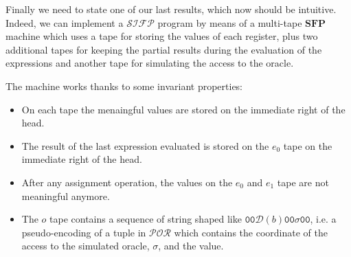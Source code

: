 \documentclass[10pt]{amsart}
\newcommand{\SFP}{\mathbf{SFP}}
\newcommand{\POR}{\mathcal{POR}}
\newcommand{\SIFP}{\mathcal{SIFP}}
\newcommand{\zero}{\mathtt{0}}
\newcommand{\NN}{\mathbb{N}}
\renewcommand{\SS}{\mathbb{S}}
\newcommand{\OO}{\mathbb{O}}
\newcommand{\db}{\mathcal D}
\newcommand{\LL}{\mathfrak L}
\newtheorem{lemma}{Lemma}
\begin{document}
\begin{comment}
\item If teh parameter is $\sigma b$, we have one more induction hypothesis which builds appropriate $g_\sigma$ and $k_\sigma$ for the $\sigma$ prefix. In this case we just need to instantiate that hypothesis on its proper inputs, then use the IH on $h_b$ instantiatinf it on its input, shift the function obtained by $k_\sigma$ and then $k_\sigma+k_{h_b}$ is the $k$ which we need to introduce and the function is the union of the $g_\sigma$ and the shifted function.
\end{itemize}
It is simple to verify that both the two conclusions hold. 
\end{itemize}
\end{proof}

Since the implementation of $\POR$ is $\SIFP$ is $\omega$-conservative, we should state a similar result for the program $P$ obtained with the procedure described in Lemma \ref{lemma:portosifp}. Formally:

\begin{lemma}
\label{lemma:sifpmap}
$\forall f \in \POR. \forall \vec x \in \SS. \forall \omega \in \OO. \exists g\in \SS^\NN. \exists k \in \NN. \forall j \in \NN. j < k \to \forall \omega' \omega'(g(j))\neq\omega(g(j))\to \LL(f)(\vec x, \omega)\neq \LL(f)(\vec x, \omega')$. Moreover the size of the function's graph is polynomial.
\end{lemma}
\begin{proof}
In Lemma \ref{lemma:portosifp}, we have proved that the translation $\LL(\cdot)$ preserves the behaviour of the program, fixed $\omega$, so the result is a consequence of Lemma \ref{lemma:pormap}. 
\end{proof}
\end{comment}


Finally we need to state one of our last results, which now should be intuitive. Indeed, we can implement a $\SIFP$ program by means of a multi-tape $\SFP$ machine which uses a tape for storing the values of each register, plus two additional tapes for keeping the partial results during the evaluation of the expressions and another tape for simulating the access to the oracle.

The machine works thanks to some invariant properties:

\begin{itemize}
\item On each tape the menaingful values are stored on the immediate right of the head.
\item The result of the last expression evaluated is stored on the $e_0$ tape on the immediate right of the head.
\item After any assignment operation, the values on the $e_0$ and $e_1$ tape are not meaningful anymore.
\item The $o$ tape contains a sequence of string shaped like $\zero \zero \db (b)\zero \zero \sigma \zero\zero$, i.e. a pseudo-encoding of a tuple in $\POR$ which contains the coordinate of the access to the simulated oracle, $\sigma$, and the value.
\end{itemize}    
\end{document}
